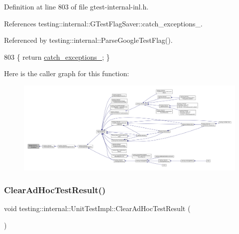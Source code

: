 Definition at line 803 of file gtest-\/internal-\/inl.\+h.



References testing\+::internal\+::\+G\+Test\+Flag\+Saver\+::catch\+\_\+exceptions\+\_\+.



Referenced by testing\+::internal\+::\+Parse\+Google\+Test\+Flag().


\begin{DoxyCode}
803 \{ \textcolor{keywordflow}{return} \hyperlink{classtesting_1_1internal_1_1UnitTestImpl_a2cc0c6f466730b1d6e884738344b8e33}{catch\_exceptions\_}; \}
\end{DoxyCode}
Here is the caller graph for this function\+:
\nopagebreak
\begin{figure}[H]
\begin{center}
\leavevmode
\includegraphics[width=350pt]{classtesting_1_1internal_1_1UnitTestImpl_aa311b980783a9cfb547831f7b19e3f3a_icgraph}
\end{center}
\end{figure}
\mbox{\label{classtesting_1_1internal_1_1UnitTestImpl_ac44629cc4fa12b788779d4aa76939510}} 
\subsubsection{\texorpdfstring{Clear\+Ad\+Hoc\+Test\+Result()}{ClearAdHocTestResult()}}
{\footnotesize\ttfamily void testing\+::internal\+::\+Unit\+Test\+Impl\+::\+Clear\+Ad\+Hoc\+Test\+Result (\begin{DoxyParamCaption}{ }\end{DoxyParamCaption})\hspace{0.3cm}{\ttfamily [inline]}}



